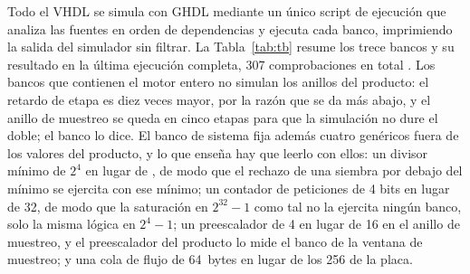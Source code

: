 Todo el VHDL se simula con GHDL mediante un único script de ejecución
que analiza las fuentes en orden de dependencias y ejecuta cada banco,
imprimiendo la salida del simulador sin filtrar. La
Tabla~\ref{tab:tb} resume los trece bancos y su resultado en la última
ejecución completa, 307 comprobaciones en total \simu{}. Los bancos que
contienen el motor entero no simulan los anillos del producto: el retardo
de etapa es diez veces mayor, por la razón que se da más abajo, y el
anillo de muestreo se queda en cinco etapas para que la simulación no
dure el doble; el banco lo dice. El banco de sistema fija además cuatro
genéricos fuera de los valores del producto, y lo que enseña hay que
leerlo con ellos: un divisor mínimo de $2^{4}$ en lugar de , de
modo que el rechazo de una siembra por debajo del mínimo se ejercita con
ese mínimo; un contador de peticiones de 4 bits en lugar de 32, de modo
que la saturación en $2^{32}-1$ como tal no la ejercita ningún banco,
solo la misma lógica en $2^{4}-1$; un preescalador de 4 en lugar de 16
en el anillo de muestreo, y el preescalador del producto lo mide el
banco de la ventana de muestreo; y una cola de flujo de 64~bytes en
lugar de los 256 de la placa.

